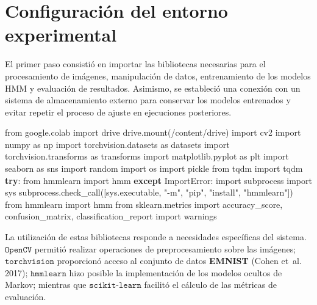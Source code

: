 \documentclass[
  spanish,
  us-letterpaper,
  DIV=11,
  numbers=noendperiod]{scrreprt}
\newenvironment{Shaded}{\begin{snugshade}}{\end{snugshade}}
\newcommand{\ControlFlowTok}[1]{\textcolor[rgb]{0.00,0.23,0.31}{\textbf{#1}}}
\newcommand{\ImportTok}[1]{\textcolor[rgb]{0.00,0.46,0.62}{#1}}
\newcommand{\NormalTok}[1]{\textcolor[rgb]{0.00,0.23,0.31}{#1}}
\newcommand{\PreprocessorTok}[1]{\textcolor[rgb]{0.68,0.00,0.00}{#1}}
\newcommand{\StringTok}[1]{\textcolor[rgb]{0.13,0.47,0.30}{#1}}
\begin{document}
\section{Configuración del entorno
experimental}\label{configuraciuxf3n-del-entorno-experimental}

El primer paso consistió en importar las bibliotecas necesarias para el
procesamiento de imágenes, manipulación de datos, entrenamiento de los
modelos HMM y evaluación de resultados. Asimismo, se estableció una
conexión con un sistema de almacenamiento externo para conservar los
modelos entrenados y evitar repetir el proceso de ajuste en ejecuciones
posteriores.

\begin{Shaded}
\begin{Highlighting}[]
\ImportTok{from}\NormalTok{ google.colab }\ImportTok{import}\NormalTok{ drive }
\NormalTok{drive.mount(}\StringTok{\textquotesingle{}/content/drive\textquotesingle{}}\NormalTok{) }
\ImportTok{import}\NormalTok{ cv2 }
\ImportTok{import}\NormalTok{ numpy }\ImportTok{as}\NormalTok{ np }
\ImportTok{import}\NormalTok{ torchvision.datasets }\ImportTok{as}\NormalTok{ datasets }
\ImportTok{import}\NormalTok{ torchvision.transforms }\ImportTok{as}\NormalTok{ transforms }
\ImportTok{import}\NormalTok{ matplotlib.pyplot }\ImportTok{as}\NormalTok{ plt }
\ImportTok{import}\NormalTok{ seaborn }\ImportTok{as}\NormalTok{ sns }
\ImportTok{import}\NormalTok{ random }
\ImportTok{import}\NormalTok{ os }
\ImportTok{import}\NormalTok{ pickle }
\ImportTok{from}\NormalTok{ tqdm }\ImportTok{import}\NormalTok{ tqdm  }
\ControlFlowTok{try}\NormalTok{:     }
    \ImportTok{from}\NormalTok{ hmmlearn }\ImportTok{import}\NormalTok{ hmm }
\ControlFlowTok{except} \PreprocessorTok{ImportError}\NormalTok{:     }
    \ImportTok{import}\NormalTok{ subprocess     }
    \ImportTok{import}\NormalTok{ sys     }
\NormalTok{    subprocess.check\_call([sys.executable, }\StringTok{"{-}m"}\NormalTok{, }\StringTok{"pip"}\NormalTok{, }\StringTok{"install"}\NormalTok{, }
                           \StringTok{"hmmlearn"}\NormalTok{])     }
    \ImportTok{from}\NormalTok{ hmmlearn }\ImportTok{import}\NormalTok{ hmm  }
\ImportTok{from}\NormalTok{ sklearn.metrics }\ImportTok{import}\NormalTok{ accuracy\_score, confusion\_matrix,}
\NormalTok{        classification\_report }
\ImportTok{import}\NormalTok{ warnings }
\end{Highlighting}
\end{Shaded}

La utilización de estas bibliotecas responde a necesidades específicas
del sistema. \(\texttt{OpenCV}\) permitió realizar operaciones de
preprocesamiento sobre las imágenes; \(\texttt{torchvision}\)
proporcionó acceso al conjunto de datos \textbf{EMNIST} (Cohen et~al.
2017); \(\texttt{hmmlearn}\) hizo posible la implementación de los
modelos ocultos de Markov; mientras que \(\texttt{scikit-learn}\)
facilitó el cálculo de las métricas de evaluación.
\end{document}
